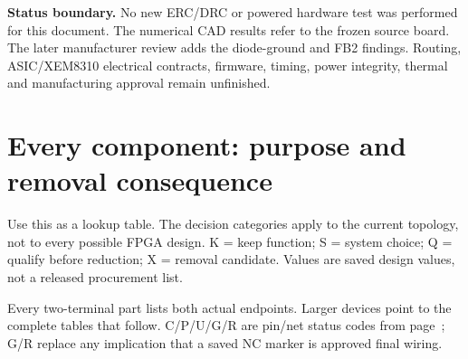 \documentclass[11pt,a4paper]{article}
\begin{document}
\textbf{Status boundary.} No new ERC/DRC or powered hardware test was performed for this document. The numerical CAD results refer to the frozen source board. The later manufacturer review adds the diode-ground and FB2 findings. Routing, ASIC/XEM8310 electrical contracts, firmware, timing, power integrity, thermal and manufacturing approval remain unfinished.

\clearpage\appendix\section{Every component: purpose and removal consequence}\label{app:parts}
Use this as a lookup table. The decision categories apply to the current topology, not to every possible FPGA design. K = keep function; S = system choice; Q = qualify before reduction; X = removal candidate. Values are saved design values, not a released procurement list.

Every two-terminal part lists both actual endpoints. Larger devices point to the complete tables that follow. C/P/U/G/R are pin/net status codes from page~\pageref{sec:pinstatus}; G/R replace any implication that a saved NC marker is approved final wiring.
\end{document}
